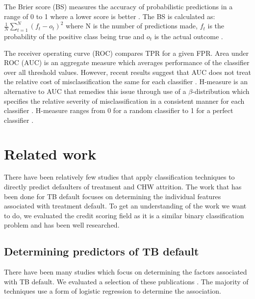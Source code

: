 \documentclass{sig-alternate-05-2015}
\begin{document}
	The Brier score (BS) measures the accuracy of probabilistic predictions in a range of 0 to 1 where a lower score is better \cite{steyerberg2010assessing}. The BS is calculated as: $\frac{1}{N}\sum_{t=1}^{N}(f_t - o_t)^2$ where N is the number of predictions made, $f_t$ is the probability of the positive class being true and $o_t$ is the actual outcome \cite{steyerberg2010assessing}.
	
	The receiver operating curve (ROC) compares TPR for a given FPR. Area under ROC (AUC) is an aggregate measure which averages performance of the classifier over all threshold values. However, recent results suggest that AUC does not treat the relative cost of misclassification the same for each classifier \cite{Hand:2009:MCP:1612990.1613009}. H-measure is an alternative to AUC that remedies this issue through use of a $\beta$-distribution which specifies the relative severity of misclassification in a consistent manner for each classifier \cite{Hand:2009:MCP:1612990.1613009}. H-measure ranges from 0 for a random classifier to 1 for a perfect classifier \cite{Hand:2009:MCP:1612990.1613009}.
	
	\section{Related work}
	There have been relatively few studies that apply classification techniques to directly predict defaulters of treatment and CHW attrition. The work that has been done for TB default focuses on determining the individual features associated with treatment default. To get an understanding of the work we want to do, we evaluated the credit scoring field as it is a similar binary classification problem and has been well researched. 
	\subsection{Determining predictors of TB default}
	\label{predictors_of_defaulters_related_work}
	There have been many studies which focus on determining the factors associated with TB default. We evaluated a selection of these publications \cite{chan:2003prevalence, Jha:10.1371/journal.pone.0008873, jittimanee:10.1111/j.1440-172X.2007.00650.x, Lackey:10356751520150601, muture:6660173120110101, Shargie:10.1371/journal.pmed.0040037}. The majority of techniques use a form of logistic regression to determine the association. 
	
\end{document}
